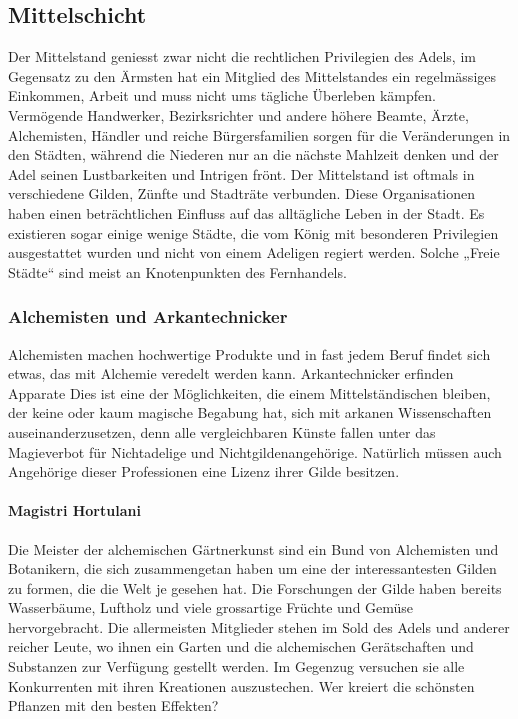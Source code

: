 \documentclass[12pt,twoside,twocolumn,openany]{book}
\begin{document}
\subsection{Mittelschicht}
Der Mittelstand geniesst zwar nicht die rechtlichen Privilegien des Adels, im Gegensatz zu den Ärmsten hat ein Mitglied des Mittelstandes ein regelmässiges Einkommen, Arbeit und muss nicht ums tägliche Überleben kämpfen. Vermögende Handwerker, Bezirksrichter und andere höhere Beamte, Ärzte, Alchemisten, Händler und reiche Bürgersfamilien sorgen für die Veränderungen in den Städten, während die Niederen nur an die nächste Mahlzeit denken und der Adel seinen Lustbarkeiten und Intrigen frönt. Der Mittelstand ist oftmals in verschiedene Gilden, Zünfte und Stadträte verbunden. Diese Organisationen haben einen beträchtlichen Einfluss auf das alltägliche Leben in der Stadt. Es existieren sogar einige wenige Städte, die vom König mit besonderen Privilegien ausgestattet wurden und nicht von einem Adeligen regiert werden. Solche „Freie Städte“ sind meist an Knotenpunkten des Fernhandels.


\subsubsection{Alchemisten und Arkantechnicker}
Alchemisten machen hochwertige Produkte und in fast jedem Beruf findet sich etwas, das mit Alchemie veredelt werden kann. Arkantechnicker erfinden Apparate  Dies ist eine der Möglichkeiten, die einem Mittelständischen bleiben, der keine oder kaum magische Begabung hat, sich mit arkanen Wissenschaften auseinanderzusetzen, denn alle vergleichbaren Künste fallen unter das Magieverbot für Nichtadelige und Nichtgildenangehörige. Natürlich müssen auch Angehörige dieser Professionen  eine Lizenz ihrer Gilde besitzen.

\paragraph{Magistri Hortulani} Die Meister der alchemischen Gärtnerkunst sind ein Bund von Alchemisten und Botanikern, die sich zusammengetan haben um eine der interessantesten Gilden zu formen, die die Welt je gesehen hat. Die Forschungen der Gilde haben bereits Wasserbäume, Luftholz und viele grossartige Früchte und Gemüse hervorgebracht. Die allermeisten Mitglieder stehen im Sold des Adels und anderer reicher Leute, wo ihnen ein Garten und die alchemischen Gerätschaften und Substanzen zur Verfügung gestellt werden. Im Gegenzug versuchen sie alle Konkurrenten mit ihren Kreationen auszustechen. Wer kreiert die schönsten Pflanzen mit den besten Effekten?
\end{document}
